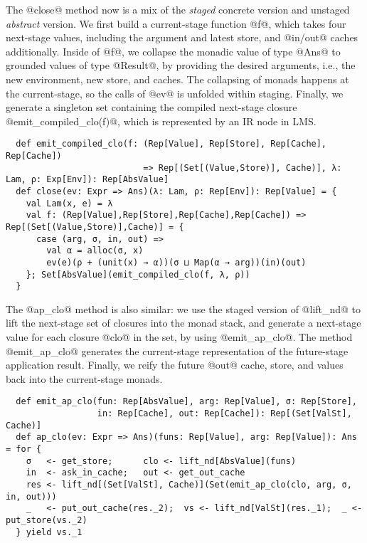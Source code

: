 The @close@ method now is a mix of the \textit{staged} concrete version and
unstaged \textit{abstract} version. We first build a current-stage function @f@, which
takes four next-stage values, including the argument and latest store, and
@in/out@ caches additionally. Inside of @f@, we collapse the monadic value of
type @Ans@ to grounded values of type @Result@, by providing the desired
arguments, i.e., the new environment, new store, and caches. The collapsing of
monads happens at the current-stage, so the calls of @ev@ is unfolded within
staging. Finally, we generate a singleton set containing the compiled
next-stage closure @emit_compiled_clo(f)@, which is represented by an IR node
in LMS.
\begin{lstlisting}
  def emit_compiled_clo(f: (Rep[Value], Rep[Store], Rep[Cache], Rep[Cache])
                           => Rep[(Set[(Value,Store)], Cache)], λ: Lam, ρ: Exp[Env]): Rep[AbsValue]
  def close(ev: Expr => Ans)(λ: Lam, ρ: Rep[Env]): Rep[Value] = {
    val Lam(x, e) = λ
    val f: (Rep[Value],Rep[Store],Rep[Cache],Rep[Cache]) => Rep[(Set[(Value,Store)],Cache)] = {
      case (arg, σ, in, out) =>
        val α = alloc(σ, x)
        ev(e)(ρ + (unit(x) → α))(σ ⊔ Map(α → arg))(in)(out)
    }; Set[AbsValue](emit_compiled_clo(f, λ, ρ))
  }
\end{lstlisting}

The @ap_clo@ method is also similar: we use the staged version of @lift_nd@ to
lift the next-stage set of closures into the monad stack, and generate a
next-stage value for each closure @clo@ in the set, by using @emit_ap_clo@. The
method @emit_ap_clo@ generates the current-stage representation of the
future-stage application result.
Finally, we reify the future @out@ cache, store, and values back into
the current-stage monads.
\begin{lstlisting}
  def emit_ap_clo(fun: Rep[AbsValue], arg: Rep[Value], σ: Rep[Store],
                  in: Rep[Cache], out: Rep[Cache]): Rep[(Set[ValSt], Cache)]
  def ap_clo(ev: Expr => Ans)(funs: Rep[Value], arg: Rep[Value]): Ans = for {
    σ   <- get_store;      clo <- lift_nd[AbsValue](funs)
    in  <- ask_in_cache;   out <- get_out_cache
    res <- lift_nd[(Set[ValSt], Cache)](Set(emit_ap_clo(clo, arg, σ, in, out)))
    _   <- put_out_cache(res._2);  vs <- lift_nd[ValSt](res._1);  _ <- put_store(vs._2)
  } yield vs._1
\end{lstlisting}

